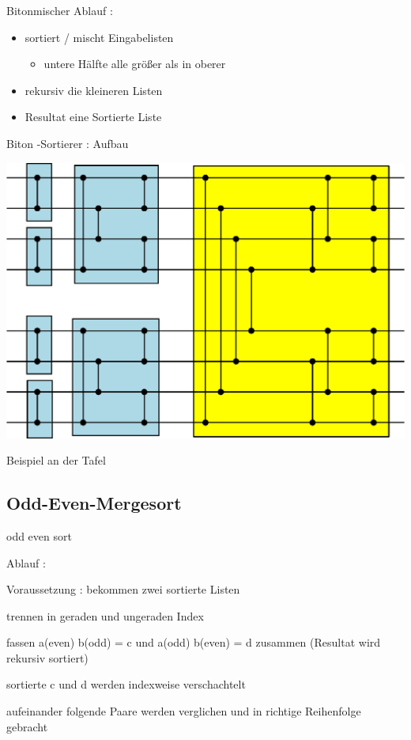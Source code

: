 \documentclass[ucs,9pt]{beamer}
\begin{document}
\begin{frame}{Bitonmischer}
Ablauf :
\begin{itemize}
\item sortiert / mischt Eingabelisten
	\begin{itemize}
	\item untere Hälfte alle größer als in oberer
	\end{itemize}
\item rekursiv die kleineren Listen 
\item Resultat eine Sortierte Liste
\end{itemize}
\end{frame}

\begin{frame}{Biton -Sortierer : Aufbau}
    \begin{center}
    		\includegraphics[scale=0.6]{biton2.eps}
    \end{center}
     { Beispiel an der Tafel}
\end{frame}


\subsection{Odd-Even-Mergesort}
\begin{frame}{odd even sort}
 {Ablauf :
\begin{itemize}
 {\item Voraussetzung : bekommen zwei sortierte Listen}
 {\item trennen in geraden und ungeraden Index}
 {\item fassen a(even) b(odd) = c und a(odd) b(even) = d zusammen (Resultat wird rekursiv sortiert)}
 {\item sortierte c und d werden indexweise verschachtelt}
 {\item aufeinander folgende Paare werden verglichen und in richtige Reihenfolge gebracht}
\end{itemize}}
\end{frame}
\end{document}
